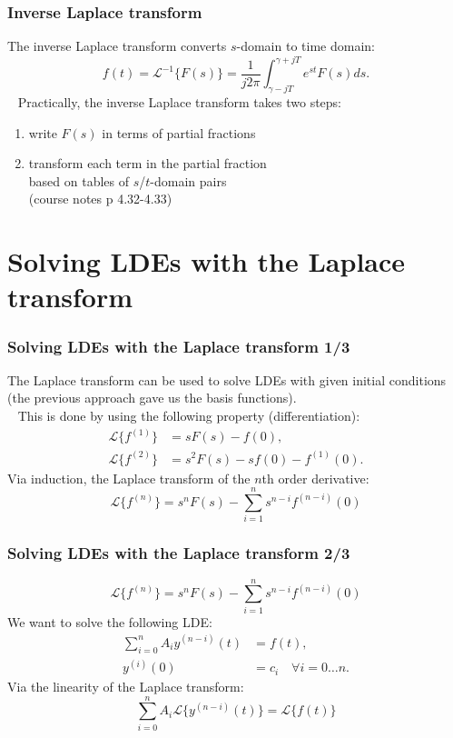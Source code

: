 \documentclass{beamer}
\begin{document}
\begin{frame}
\frametitle{Inverse Laplace transform}
The inverse Laplace transform converts $s$-domain to time domain:
\begin{equation*}
f(t) = \mathcal{L}^{-1}\{F(s)\} = \frac{1}{j2\pi}\int_{\gamma-jT}^{\gamma+jT} e^{st} F(s) ds.
\end{equation*}
\pause
\ \newline
Practically, the inverse Laplace transform takes two steps:
\begin{enumerate}
\item write $F(s)$ in terms of partial fractions
\item transform each term in the partial fraction \\ based on tables of $s$/$t$-domain pairs \\ (course notes p 4.32-4.33)
\end{enumerate}
\end{frame}

\section{Solving LDEs with the Laplace transform}

\begin{frame}
\frametitle{Solving LDEs with the Laplace transform 1/3}
The Laplace transform can be used to solve LDEs with given initial conditions 
(the previous approach gave us the basis functions). \\
\pause
\ \newline
This is done by using the following property (differentiation):
\begin{align*}
\mathcal{L}\{f^{(1)}\} &= s F(s) - f(0), \\
\mathcal{L}\{f^{(2)}\} &= s^2 F(s) -s f(0) - f^{(1)}(0).
\end{align*}
\pause
Via induction, the Laplace transform of the $n$th order derivative:
\begin{equation*}
\mathcal{L}\{f^{(n)}\} = s^n F(s) - \sum_{i=1}^n s^{n-i}f^{(n-i)}(0)
\end{equation*}
\end{frame}

\begin{frame}
\frametitle{Solving LDEs with the Laplace transform 2/3}
\begin{equation*}
\mathcal{L}\{f^{(n)}\} = s^n F(s) - \sum_{i=1}^n s^{n-i}f^{(n-i)}(0)
\end{equation*}
\pause
We want to solve the following LDE:
\begin{align*}
\sum_{i=0}^{n} A_i y^{(n-i)}(t) &= f(t), \\
y^{(i)}(0) &= c_i \quad \forall i=0\ldots n.
\end{align*}
\pause
Via the linearity of the Laplace transform:
\begin{equation*}
\sum_{i=0}^{n} A_i \mathcal{L}\{y^{(n-i)}(t)\} = \mathcal{L}\{f(t)\} 
\end{equation*}
\end{frame}
\end{document}

